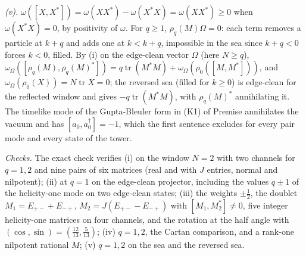 \emph{(v).} $\omega([X, X^{*}]) = \omega(XX^{*}) - \omega(X^{*}X) = \omega(XX^{*}) \ge 0$ when $\omega(X^{*}X) = 0$, by positivity of $\omega$. For $q \ge 1$, $\rho_{q}(M)\Omega = 0$: each term removes a particle at $k + q$ and adds one at $k < k + q$, impossible in the sea since $k + q < 0$ forces $k < 0$, filled. By (i) on the edge-clean vector $\Omega$ (here $N \ge q$), $\omega_{\Omega}([\rho_{q}(M), \rho_{q}(M)^{*}]) = q\operatorname{tr}(M^{*}M) + \omega_{\Omega}(\rho_{0}([M, M^{*}]))$, and $\omega_{\Omega}(\rho_{0}(X)) = N\operatorname{tr}X = 0$; the reversed sea (filled for $k \ge 0$) is edge-clean for the reflected window and gives $-q\operatorname{tr}(M^{*}M)$, with $\rho_{q}(M)^{*}$ annihilating it. The timelike mode of the Gupta-Bleuler form in (K1) of Premise  annihilates the vacuum and has $[a_{0}, a_{0}^{\dagger}] = -1$, which the first sentence excludes for every pair mode and every state of the tower.

\emph{Checks.} The exact check verifies (i) on the window $N = 2$ with two channels for $q = 1, 2$ and nine pairs of six matrices (real and with $J$ entries, normal and nilpotent); (ii) at $q = 1$ on the edge-clean projector, including the values $q \pm 1$ of the helicity-one mode on two edge-clean states; (iii) the weights $\pm\tfrac12$, the doublet $M_{1} = E_{+-} + E_{-+}$, $M_{2} = J(E_{+-} - E_{-+})$ with $[M_{1}, M_{2}^{*}] \ne 0$, five integer helicity-one matrices on four channels, and the rotation at the half angle with $(\cos, \sin) = (\tfrac{12}{13}, \tfrac{5}{13})$; (iv) $q = 1, 2$, the Cartan comparison, and a rank-one nilpotent rational $M$; (v) $q = 1, 2$ on the sea and the reversed sea.
